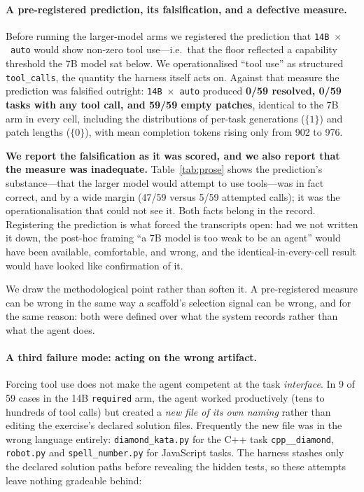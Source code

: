 \documentclass{article}
\begin{document}
\paragraph{A pre-registered prediction, its falsification, and a defective
measure.}
Before running the larger-model arms we registered the prediction that
\texttt{14B}~$\times$~\texttt{auto} would show non-zero tool use---i.e.\ that
the floor reflected a capability threshold the 7B model sat below. We
operationalised ``tool use'' as structured \texttt{tool\_calls}, the quantity
the harness itself acts on. Against that measure the prediction was falsified
outright: \texttt{14B}~$\times$~\texttt{auto} produced \textbf{0/59 resolved,
0/59 tasks with any tool call, and 59/59 empty patches}, identical to the 7B
arm in every cell, including the distributions of per-task generations
($\{1\}$) and patch lengths ($\{0\}$), with mean completion tokens rising
only from 902 to 976.

\textbf{We report the falsification as it was scored, and we also report that
the measure was inadequate.} Table~\ref{tab:prose} shows the prediction's
substance---that the larger model would attempt to use tools---was in fact
correct, and by a wide margin (47/59 versus 5/59 attempted calls); it was the
operationalisation that could not see it. Both facts belong in the record.
Registering the prediction is what forced the transcripts open: had we not
written it down, the post-hoc framing ``a 7B model is too weak to be an
agent'' would have been available, comfortable, and wrong, and the
identical-in-every-cell result would have looked like confirmation of it.

We draw the methodological point rather than soften it. A pre-registered
measure can be wrong in the same way a scaffold's selection signal can be
wrong, and for the same reason: both were defined over what the system
records rather than what the agent does.

\paragraph{A third failure mode: acting on the wrong artifact.}
Forcing tool use does not make the agent competent at the task
\emph{interface}. In 9 of 59 cases in the 14B \texttt{required} arm, the agent
worked productively (tens to hundreds of tool calls) but created a
\emph{new file of its own naming} rather than editing the exercise's declared
solution files. Frequently the new file was in the wrong language entirely:
\texttt{diamond\_kata.py} for the C++ task \texttt{cpp\_\_diamond},
\texttt{robot.py} and \texttt{spell\_number.py} for JavaScript tasks. The
harness stashes only the declared solution paths before revealing the hidden
tests, so these attempts leave nothing gradeable behind:
\end{document}
